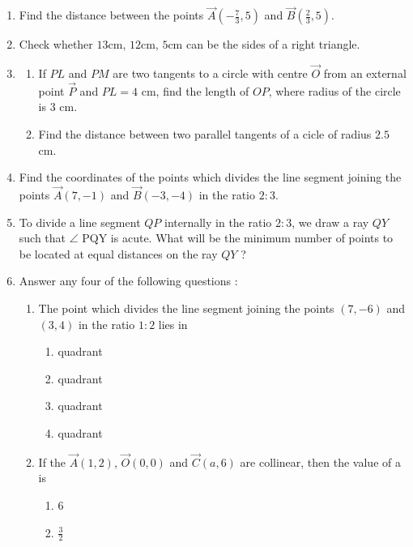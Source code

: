 \begin{enumerate}[label=\thesection.\arabic*.,ref=\thesection.\theenumi]		
	\item Find the distance between the points $\vec{A}(-\frac{7}{3},5)$ and $\vec{B}(\frac{2}{3},5)$.                  	\item Check whether $13$cm, $12$cm, $5$cm can be the sides of a right triangle.
	\item \begin{enumerate}[label=(\alph*)]
			\item If $PL$ and $PM$ are two tangents to a circle with centre $\vec{O}$ from an external point $\vec{P}$ and $PL=4$ cm, find the length of $OP$, where radius of the circle is 3 cm.
		\item Find the distance between two parallel tangents of a cicle of radius $2.5$ cm.
             \end{enumerate}
     \item Find the coordinates of the points which divides the line segment joining the points $\vec{A}(7,-1)$ and $\vec{B}(-3,-4)$ in the ratio $2:3$.	
     \item To divide a line segment $QP$ internally in the ratio $2:3$, we draw a ray $QY$ such that $\angle$ PQY is acute. What will be  the minimum number of points to be located at equal distances on the ray $QY$ ?
     \item Answer any four of the following questions :
	     \begin{enumerate}[label=(\roman*)]
		     \item The point which divides the line segment joining the points $(7,-6)$ and $(3,4)$ in the ratio $1:2$ lies in
			     \begin{enumerate}[label=(\Alph*)]
                              \item {} quadrant
			      \item {} quadrant
			      \item {} quadrant
			      \item {} quadrant
			     \end{enumerate}
		     \item If the $\vec{A}(1, 2)$, $\vec{O}(0, 0)$ and $\vec{C}(a, 6)$ are collinear, then the value of a is
			     \begin{enumerate}[label=(\Alph*)]
				     \item $6$
				     \item $\frac{3}{2}$

\end{enumerate}
\end{enumerate}
\end{enumerate}
